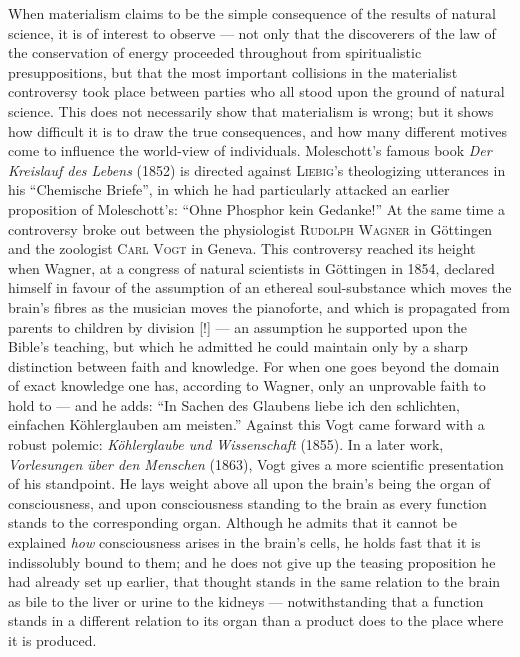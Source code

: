 \documentclass[12pt,a4paper]{book}
\newcommand{\opage}[1]{\marginnote{\footnotesize\textit{[#1]}}}
\begin{document}
When materialism claims to be the simple consequence of the results of natural
science, it is of interest to observe --- not only that the discoverers of the
law of the conservation of energy proceeded throughout from spiritualistic
presuppositions, but that the most important collisions in the materialist
controversy took place between parties who all stood upon the ground of natural
science. This does not necessarily show that materialism is wrong; but it shows
how difficult it is to draw the true consequences, and how many different
motives come to influence the world-view of individuals. Moleschott's famous
book \textit{Der \opage{502}Kreislauf des Lebens} (1852) is directed against
\textsc{Liebig}'s theologizing utterances in his ``Chemische Briefe'', in which
he had particularly attacked an earlier proposition of Moleschott's: ``Ohne
Phosphor kein Gedanke!'' At the same time a controversy broke out between the
physiologist \textsc{Rudolph Wagner} in Göttingen and the zoologist \textsc{Carl
Vogt} in Geneva. This controversy reached its height when Wagner, at a congress
of natural scientists in Göttingen in 1854, declared himself in favour of the
assumption of an ethereal soul-substance which moves the brain's fibres as the
musician moves the pianoforte, and which is propagated from parents to children
by division [!] --- an assumption he supported upon the Bible's teaching, but
which he admitted he could maintain only by a sharp distinction between faith
and knowledge. For when one goes beyond the domain of exact knowledge one has,
according to Wagner, only an unprovable faith to hold to --- and he adds: ``In
Sachen des Glaubens liebe ich den schlichten, einfachen Köhlerglauben am
meisten.'' Against this Vogt came forward with a robust polemic:
\textit{Köhlerglaube und Wissenschaft} (1855). In a later work,
\textit{Vorlesungen über den Menschen} (1863), Vogt gives a more scientific
presentation of his standpoint. He lays weight above all upon the brain's being
the organ of consciousness, and upon consciousness standing to the brain as
every function stands to the corresponding organ. Although he admits that it
cannot be explained \emph{how} consciousness arises in the brain's cells, he
holds fast that it is indissolubly bound to them; and he does not give up the
teasing proposition he had already set up earlier, that thought stands in the
same relation to the brain as bile to the liver or urine to the kidneys ---
notwithstanding that a function stands in a different relation to its organ than
a product does to the place where it is produced.
\end{document}
